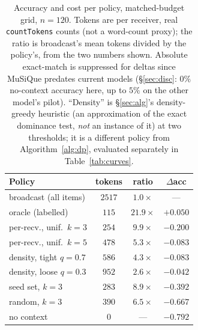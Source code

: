 \documentclass[sigconf,anonymous]{aamas}
\theoremstyle{remark}
\begin{document}
\begin{table}[t]
\centering
\caption{Accuracy and cost per policy, matched-budget grid, $n=120$.
Tokens are per receiver, real \texttt{countTokens} counts (not a
word-count proxy); the ratio is broadcast's mean tokens divided by the
policy's, from the two numbers shown. Absolute exact-match is
suppressed for deltas since MuSiQue predates current models
(\S\ref{sec:disc}: $0\%$ no-context accuracy here, up to $5\%$ on the
other model's pilot). ``Density'' is \S\ref{sec:alg}'s density-greedy heuristic (an
approximation of the exact dominance test, \emph{not} an instance of
it) at two thresholds; it is a different policy from
Algorithm~\ref{alg:dp}, evaluated separately in Table~\ref{tab:curves}.}
\label{tab:policies}
\small
\begin{tabular}{lccc}
\toprule
Policy & tokens & ratio & $\Delta$acc \\
\midrule
broadcast (all items)  & $2517$ & $1.0\times$  & --- \\
oracle (labelled)      & $115$  & $21.9\times$ & $+0.050$ \\
per-recv., unif.\ $k{=}3$ & $254$ & $9.9\times$ & $-0.200$ \\
per-recv., unif.\ $k{=}5$ & $478$ & $5.3\times$ & $-0.083$ \\
density, tight $q{=}0.7$ & $586$ & $4.3\times$  & $-0.083$ \\
density, loose $q{=}0.3$ & $952$ & $2.6\times$  & $-0.042$ \\
seed set, $k{=}3$      & $283$  & $8.9\times$  & $-0.392$ \\
random, $k{=}3$        & $390$  & $6.5\times$  & $-0.667$ \\
no context             & $0$    & ---          & $-0.792$ \\
\bottomrule
\end{tabular}
\end{table}
\end{document}
